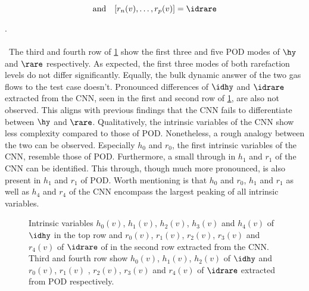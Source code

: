 \begin{minipage}{0.45\textwidth}
	\begin{equation}
	\mathrm{and}\quad[r_n(v),\dots,r_p(v)] = \idrare
	\end{equation}
\end{minipage}.\\\\\
The third and fourth row of \cref{Fig: CNNPOD} show the first three and five POD modes of \(\hy\) and \(\rare\) respectively. As expected, the first three modes of both rarefaction levels do not differ significantly. Equally, the bulk dynamic answer of the two gas flows to the test case doesn't. Pronounced differences of \(\idhy\) and \(\idrare\) extracted from the CNN, seen in the first and second row of \cref{Fig: CNNPOD}, are also not observed. This aligns with previous findings that the CNN fails to differentiate between \(\hy\) and \(\rare\). Qualitatively, the intrinsic variables of the CNN show less complexity compared to those of POD. Nonetheless, a rough analogy between the two can be observed. Especially \(h_0\) and \(r_0\), the first intrinsic variables of the CNN, resemble those of POD. Furthermore, a small through in \(h_1\) and \(r_1\) of the CNN can be identified. This through, though much more pronounced, is also present in \(h_1\) and \(r_1\) of POD. Worth mentioning is that \(h_0\) and \(r_0\), \(h_1\) and \(r_1\) as well as \(h_4\) and \(r_4\) of the CNN encompass the largest peaking of all intrinsic variables.\\    
\begin{figure}[hp!]
	
	\caption{Intrinsic variables \(h_0(v)\), \(h_1(v)\), \(h_2(v)\), \(h_3(v)\) and \(h_4(v)\) of \(\idhy\) in the top row and \(r_0(v)\), \(r_1(v)\), \(r_2(v)\), \(r_3(v)\) and \(r_4(v)\) of \(\idrare\) of in the second row extracted from the CNN. Third and fourth row show \(h_0(v)\), \(h_1(v)\), \(h_2(v)\) of \(\idhy\) and \(r_0(v)\), \(r_1(v)\) , \(r_2(v)\), \(r_3(v)\) and \(r_4(v)\) of \(\idrare\) extracted from POD respectively.}
	\label{Fig: CNNPOD}
\end{figure}

